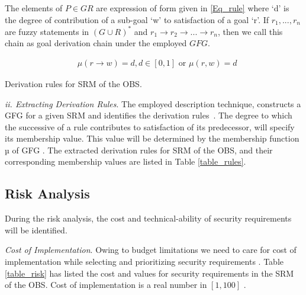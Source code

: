 The elements of $P \in GR $ are expression of form given in \ref{Eq_rule} where `d' is the degree of contribution of a sub-goal `w' to satisfaction of a goal `r'. If $r_{1},..., r_{n}$ are fuzzy statements in $(G \cup R)^*$ and $r_{1} \rightarrow r_{2} \rightarrow ... \rightarrow r_{n}$, then we call this chain as goal derivation chain under the employed $GFG$. 

\begin{align}
\label{Eq_rule}
& \mu(r\rightarrow w)=d , d\in[0,1] \text{ or } \mu(r,w)=d
\end{align}

\begin{table*}[t]
	\caption{Derivation rules for SRM of the OBS.}
	\label{table_rules}
	\centering
	
\end{table*}

\textit{ii. Extracting Derivation Rules}. The employed description technique, constructs a GFG for a given SRM and identifies the derivation rules~\cite{mougouei2013fuzzy,mougouei2013fuzzyBased,mougouei2013fuzzy1}. The degree to which the successive of a rule contributes to satisfaction of its predecessor, will specify its membership value. This value will be determined by the membership function µ of GFG \cite{mougouei2013fuzzyBased}. The extracted derivation rules for SRM of the OBS, and their corresponding membership values are listed in Table \ref{table_rules}. 


\subsection{Risk Analysis}
\label{prepas_risk} 

During the risk analysis, the cost and technical-ability of security requirements will be identified. 

\textit{Cost of Implementation}. Owing to budget limitations we need to care for cost of implementation while selecting and prioritizing security requirements \cite{karlsson1997cost}. Table \ref{table_risk} has listed the cost and values for security requirements in the SRM of the OBS. Cost of implementation is a real number in $[1,100]$ \cite{mougouei2012measuring,mougouei2012evaluating}.  


